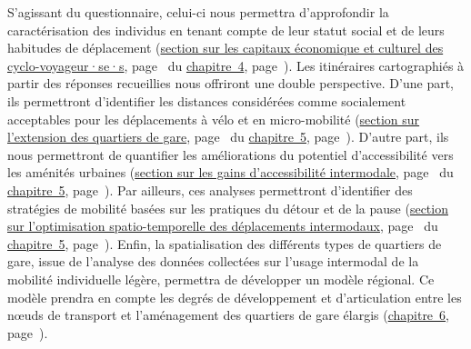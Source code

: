 \begin{refsegment}
S’agissant du questionnaire, celui-ci nous permettra d’approfondir la caractérisation des individus en tenant compte de leur statut social et de leurs habitudes de déplacement (\hyperref[chap4:capital-economique-culturel]{section sur les capitaux économique et culturel des cyclo-voyageur·se·s}, page~\pageref{chap4:capital-economique-culturel} du \hyperref[chap4:titre]{chapitre~4}, page~\pageref{chap4:titre}). Les itinéraires cartographiés à partir des réponses recueillies nous offriront une double perspective. D’une part, ils permettront d’identifier les distances considérées comme socialement acceptables pour les déplacements à vélo et en micro-mobilité (\hyperref[chap5:aire-secondaire-quartier-gare]{section sur l’extension des quartiers de gare}, page~\pageref{chap5:aire-secondaire-quartier-gare} du \hyperref[chap5:titre]{chapitre~5}, page~\pageref{chap5:titre}). D’autre part, ils nous permettront de quantifier les améliorations du potentiel d’accessibilité vers les aménités urbaines (\hyperref[chap5:accessibilite-intermodale-extension-aire-influence]{section sur les gains d’accessibilité intermodale}, page~\pageref{chap5:accessibilite-intermodale-extension-aire-influence} du \hyperref[chap5:titre]{chapitre~5}, page~\pageref{chap5:titre}). Par ailleurs, ces analyses permettront d’identifier des stratégies de mobilité basées sur les pratiques du détour et de la \gls{pause} (\hyperref[chap5:detours-pauses-optimisation]{section sur l’optimisation spatio-temporelle des déplacements intermodaux}, page~\pageref{chap5:detours-pauses-optimisation} du \hyperref[chap5:titre]{chapitre~5}, page~\pageref{chap5:titre}). Enfin, la spatialisation des différents types de quartiers de gare, issue de l’analyse des données collectées sur l’usage intermodal de la mobilité individuelle légère, permettra de développer un modèle régional. Ce modèle prendra en compte les degrés de développement et d’articulation entre les nœuds de transport et l’aménagement des quartiers de gare élargis (\hyperref[chap6:titre]{chapitre~6}, page~\pageref{chap6:titre}).%


\end{refsegment}
